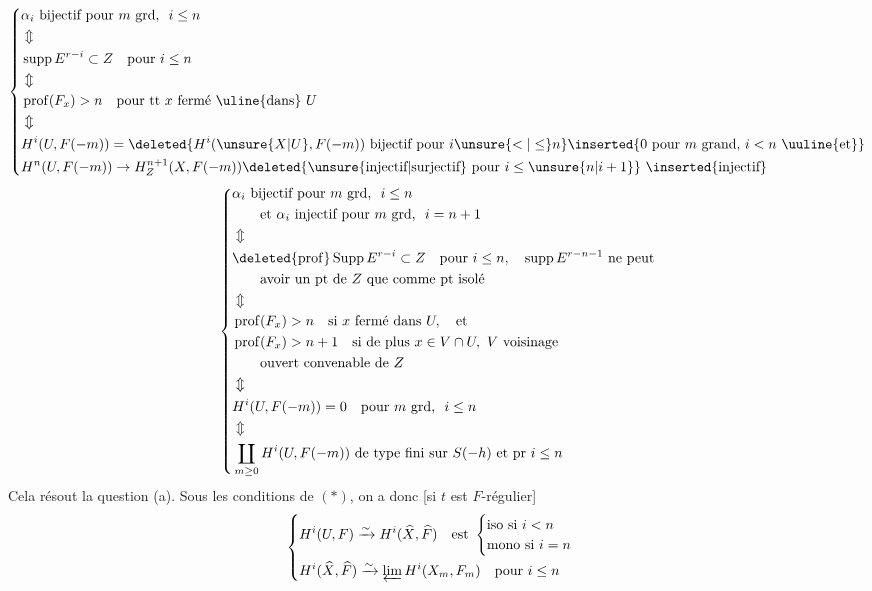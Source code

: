 \[
\left\{\begin{aligned}
&\alpha_i\text{ bijectif pour }m\text{ grd, }\ i\leq n\\
&\Updownarrow\\
&\operatorname{supp}E^{r-i}\subset Z\quad\text{pour }i\leq n\\
&\Updownarrow\\
&\operatorname{prof}(F_x)>n\quad\text{pour tt }x\text{ fermé \uline{dans} }U\\
&\Updownarrow\\
&H^i(U,F(-m))=\deleted{H^i(\unsure{X|U},F(-m))\ \text{bijectif pour }i\unsure{<|\leq}n}
\inserted{0\ \text{pour }m\text{ grand, }i<n\text{ \uuline{et}}}\\
&H^n(U,F(-m))\to H^{n+1}_Z(X,F(-m))
\deleted{\text{\unsure{injectif|surjectif} pour }i\leq\unsure{n|i+1}}\ \inserted{\text{injectif}}
\end{aligned}\right.
\]
\[
\left\{\begin{aligned}
&\alpha_i\text{ bijectif pour }m\text{ grd, }\ i\leq n\\
&\qquad\text{et }\alpha_i\text{ injectif pour }m\text{ grd, }\ i=n+1\\
&\Updownarrow\\
&\deleted{\operatorname{prof}}\operatorname{Supp} E^{r-i}\subset Z\quad\text{pour }i\leq n,\quad
\operatorname{supp} E^{r-n-1}\text{ ne peut}\\
&\qquad\text{avoir un pt de }Z\text{ que comme pt isolé}\\
&\Updownarrow\\
&\operatorname{prof}(F_x)>n\quad\text{si }x\text{ fermé dans }U,\quad\text{et}\\
&\operatorname{prof}(F_x)>n+1\quad\text{si de plus }x\in V\cap U,\ V\text{ voisinage}\\
&\qquad\text{ouvert convenable de }Z\\
&\Updownarrow\\
&H^i(U,F(-m))=0\quad\text{pour }m\text{ grd, }\ i\leq n\\
&\Updownarrow\\
&\coprod_{m\geq0} H^i(U,F(-m))\ \text{de type fini sur }S(-h)\ \text{et pr }i\leq n
\end{aligned}\right.
\]
Cela résout la question (a). Sous les conditions de $(*)$, on a donc [si $t$ est $F$-régulier]
\[
\left\{\begin{aligned}
&H^i(U,F)\xrightarrow{\sim} H^i(\widehat X,\widehat F)\quad\text{est }
\begin{cases}\text{iso si }i<n\\ \text{mono si }i=n\end{cases}\\
&H^i(\widehat X,\widehat F)\xrightarrow{\sim}\varprojlim H^i(X_m,F_m)\quad\text{pour }i\leq n
\end{aligned}\right.
\]
